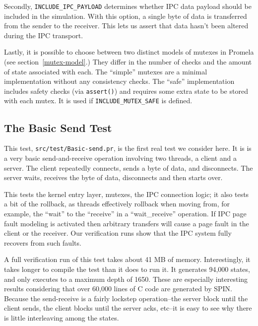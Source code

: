 Secondly, {\tt INCLUDE_IPC_PAYLOAD} determines whether IPC data payload
should be included in the simulation. With this option, a single byte
of data is transferred from the sender to the receiver. This lets us
assert that data hasn't been altered during the IPC transport.

Lastly, it is possible to choose between two distinct models of 
mutexes in Promela (see section~\ref{mutex-model}.) 
They differ in the number of checks and the amount of state 
associated with each.  The ``simple'' mutexes are a minimal 
implementation without any consistency checks. 
The ``safe'' implementation includes safety checks (via {\tt assert()})
and requires some extra state to be stored with each mutex. 
It is used if {\tt INCLUDE_MUTEX_SAFE} is defined.


\subsection{The Basic Send Test}

This test, {\tt src/test/Basic-send.pr}, is the first real test we
consider here.  It is is a very basic send-and-receive operation
involving two threads, a client and a server.  The client repeatedly
connects, sends a byte of data, and disconnects.  The server waits,
receives the byte of data, disconnects and then starts over.

%
%
This tests the kernel entry layer, mutexes, the IPC connection
logic; it also tests a bit of the rollback, as threads effectively
rollback when moving from, for example, the ``wait'' to the
``receive'' in a ``wait_receive'' operation.  If IPC page fault
modeling is activated then arbitrary transfers will cause a page
fault in the client or the receiver. Our verification runs show
that the IPC system fully recovers from such faults.

A full verification run of this test takes about 41 MB of memory.
Interestingly, it takes longer to compile the test than it does to run
it.  It generates 94,000 states, and only executes to a maximum depth of 1650.
These are especially interesting results considering that over 60,000
lines of C code are generated by SPIN.
Because the send-receive is a fairly lockstep
operation--the server block until the client sends, the client blocks
until the server acks, etc--it is easy to see why there is little 
interleaving among the states.

